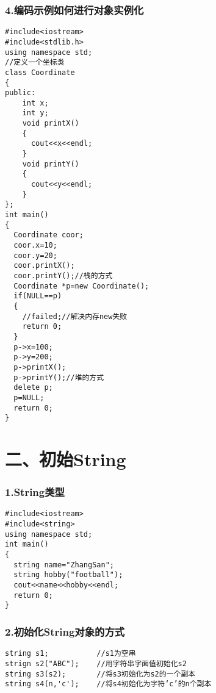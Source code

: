 \documentclass{article}
\begin{document}
\begin{CJK}{UTF8}{gbsn}
\section*{4.编码示例如何进行对象实例化}
\begin{verbatim}
#include<iostream>
#include<stdlib.h>
using namespace std;
//定义一个坐标类
class Coordinate
{
public:
    int x;
    int y;
    void printX()
    {
      cout<<x<<endl;
    }
    void printY()
    {
      cout<<y<<endl;
    }
};
int main()
{
  Coordinate coor;
  coor.x=10;
  coor.y=20;
  coor.printX();
  coor.printY();//栈的方式
  Coordinate *p=new Coordinate();
  if(NULL==p)
  {
    //failed;//解决内存new失败
    return 0;
  }
  p->x=100;
  p->y=200;
  p->printX();
  p->printY();//堆的方式
  delete p;
  p=NULL;
  return 0;
}
\end{verbatim}
\part*{二、初始String}
\section*{1.String类型}
\begin{verbatim}
#include<iostream>
#include<string>
using namespace std;
int main()
{
  string name="ZhangSan";
  string hobby("football");
  cout<<name<<hobby<<endl;
  return 0;
}
\end{verbatim}
\section*{2.初始化String对象的方式}
\begin{verbatim}
string s1;           //s1为空串
strign s2("ABC");    //用字符串字面值初始化s2
string s3(s2);       //将s3初始化为s2的一个副本
string s4(n,'c');    //将s4初始化为字符‘c’的n个副本
\end{verbatim}

\end{CJK}
\end{document}
